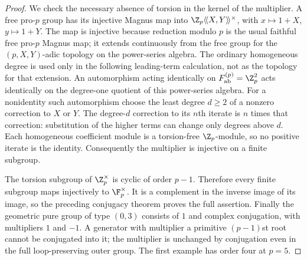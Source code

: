 \begin{proof}
We check the necessary absence of torsion in the kernel of the multiplier. A free pro-$p$ group has its injective Magnus map into
$\Z_p\langle\!\langle X,Y\rangle\!\rangle^\times$, with $x\mapsto1+X$, $y\mapsto1+Y$. The map is injective because reduction modulo $p$ is the usual faithful free pro-$p$ Magnus map; it extends continuously from the free group for the $(p,X,Y)$-adic topology on the power-series algebra. The ordinary homogeneous degree is used only in the following leading-term calculation, not as the topology for that extension. An automorphism acting identically on $F^{(p)}_{\rm ab}=\Z_p^2$ acts identically on the degree-one quotient of this power-series algebra. For a nonidentity such automorphism choose the least degree $d\geq2$ of a nonzero correction to $X$ or $Y$. The degree-$d$ correction to its $n$th iterate is $n$ times that correction: substitution of the higher terms can change only degrees above $d$. Each homogeneous coefficient module is a torsion-free $\Z_p$-module, so no positive iterate is the identity. Consequently the multiplier is injective on a finite subgroup.

The torsion subgroup of $\Z_p^\times$ is cyclic of order $p-1$. Therefore every finite subgroup maps injectively to $\F_p^\times$. It is a complement in the inverse image of its image, so the preceding conjugacy theorem proves the full assertion. Finally the geometric pure group of type $(0,3)$ consists of $1$ and complex conjugation, with multipliers $1$ and $-1$. A generator with multiplier a primitive $(p-1)$st root cannot be conjugated into it; the multiplier is unchanged by conjugation even in the full loop-preserving outer group. The first example has order four at $p=5$.
\end{proof}

